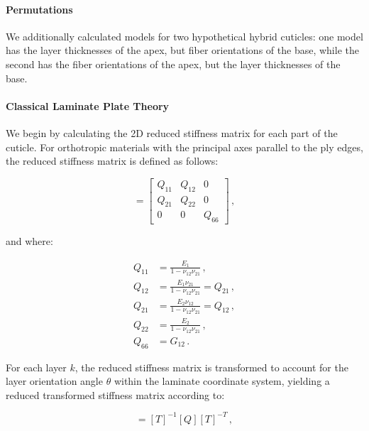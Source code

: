 \documentclass[twocolumn, linenumbers, superscriptaddress]{revtex4-1}
\begin{document}
			\paragraph*{Permutations}
				We additionally calculated models for two hypothetical hybrid cuticles: one model has the layer thicknesses of the apex, but fiber orientations of the base, while the second has the fiber orientations of the apex, but the layer thicknesses of the base.
			\paragraph*{Classical Laminate Plate Theory}
				We begin by calculating the 2D reduced stiffness matrix for each part of the cuticle.
				For orthotropic materials with the principal axes parallel to the ply edges, the reduced stiffness matrix is defined as follows:
				
				\begin{equation}
				[Q] =
					\begin{bmatrix}
						Q_{11} & Q_{12} & 0 \\
						Q_{21} & Q_{22} & 0 \\
						0 & 0 & Q_{66}
					\end{bmatrix}\,,
				\end{equation}
				
				and where:
				
				\begin{equation}
				\begin{aligned}
					Q_{11} & = \frac{E_{1}}{1 - \nu_{12}\nu_{21}}\,, \\
					Q_{12} & = \frac{E_{1}\nu_{21}}{1 - \nu_{12}\nu_{21}} = Q_{21}\,, \\
					Q_{21} & = \frac{E_{2}\nu_{12}}{1 - \nu_{12}\nu_{21}} = Q_{12}\,, \\
					Q_{22} & = \frac{E_{2}}{1 - \nu_{12}\nu_{21}}\,, \\
					Q_{66} & = G_{12}\,.
				\end{aligned}
				\end{equation}
				
				For each layer $k$, the reduced stiffness matrix is transformed to account for the layer orientation angle $\theta$ within the laminate coordinate system, yielding a reduced transformed stiffness matrix according to:
				
				\begin{equation}
					[\bar{Q}] = [T]^{-1}[Q][T]^{-T}\,,
				\end{equation}
				
\end{document}
